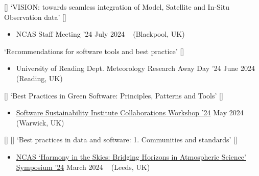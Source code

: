 \begin{talks}
    \talk
	{\faCommentingO \hspace{1mm} [\faUserPlus] \hspace{1mm} `VISION: towards seamless integration of Model, Satellite and In-Situ Observation data' [\href{https://github.com/sadielbartholomew/sadielbartholomew/blob/master/talks-and-workshops/ncas-agm-24-vision-team-talk.pdf}{\small{\linkSymbol}}]}
	{
	\begin{itemize}[leftmargin=.4in]
	    \item NCAS Staff Meeting '24
	    \hfill July 2024 ~ (Blackpool, UK)
	\end{itemize}
	}

    \talk
	{\faCommentingO \hspace{1mm} `Recommendations for software tools and best practice' [\href{https://github.com/sadielbartholomew/sadielbartholomew/blob/master/talks-and-workshops/met_away_day_24_tools_best_prac.pdf}{\small{\linkSymbol}}]}
	{
	\begin{itemize}[leftmargin=.4in]
	    \item University of Reading Dept. Meteorology Research Away Day '24
	    \hfill June 2024 ~ (Reading, UK)
	\end{itemize}
	}

    \talk
	{\faWrench \hspace{1mm} [\faUserPlus] \hspace{1mm} `Best Practices in Green Software: Principles, Patterns and Tools' [\href{https://www.youtube.com/watch?v=dWoRartHwgA}{\small{\videoSymbol}}]}
	{
	\begin{itemize}[leftmargin=.4in]
	    \item \href{https://www.software.ac.uk/workshop/collaborations-workshop-2024-cw24}{Software Sustainability Institute Collaborations Workshop '24}
	    \hfill May 2024 ~ (Warwick, UK)
	\end{itemize}
	}

    \talk
	{\faCommentingO \hspace{1mm} [\faUserPlus] \hspace{1mm} [\faEnvelopeO] \hspace{1mm} `Best practices in data and software: 1. Communities and standards' [\href{https://github.com/sadielbartholomew/sadielbartholomew/blob/master/talks-and-workshops/ncas-ec-symposium-software-data.pdf}{\small{\linkSymbol}}]}
	{
	\begin{itemize}[leftmargin=.4in]
	    \item \href{https://sites.google.com/ncas.ac.uk/ncasharmonyintheskies/home}{NCAS `Harmony in the Skies: Bridging Horizons in Atmospheric Science' Symposium '24}
	    \hfill March 2024 ~ (Leeds, UK)
	\end{itemize}
	}


\end{talks}
